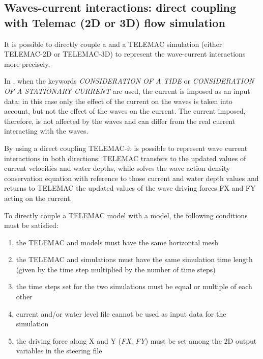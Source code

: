 \subsection{ Waves-current interactions: direct coupling with Telemac (2D or 3D) flow simulation}

 It is possible to directly couple a \tomawac and a TELEMAC simulation (either TELEMAC-2D or TELEMAC-3D) to represent the wave-current interactions more precisely.

 In \tomawac, when the keywords \textit{CONSIDERATION OF A TIDE} or \textit{CONSIDERATION OF A STATIONARY CURRENT} are used, the current is imposed as an input data: in this case only the effect of the current on the waves is taken into account, but not the effect of the waves on the current. The current imposed, therefore, is not affected by the waves and can differ from the real current interacting with the waves.

 By using a direct coupling TELEMAC-\tomawac it is possible to represent wave current interactions in both directions: TELEMAC transfers to \tomawac the updated values of current velocities and water depths, while \tomawac solves the wave action density conservation equation with reference to those current and water depth values and returns to TELEMAC the updated values of the wave driving forces FX and FY acting on the current.

 To directly couple a TELEMAC model with a \tomawac model, the following conditions must be satisfied:

\begin{enumerate}
\item  the TELEMAC and \tomawac models must have the same horizontal mesh

\item  the TELEMAC and \tomawac simulations must have the same simulation time length (given by the time step multiplied by the number of time steps)

\item  the time steps set for the two simulations must be equal or multiple of each other

\item  current and/or water level file cannot be used as input data for the \tomawac simulation

\item  the driving force along X and Y (\textit{FX}, \textit{FY}) must be set among the 2D output variables in the steering file
\end{enumerate}




